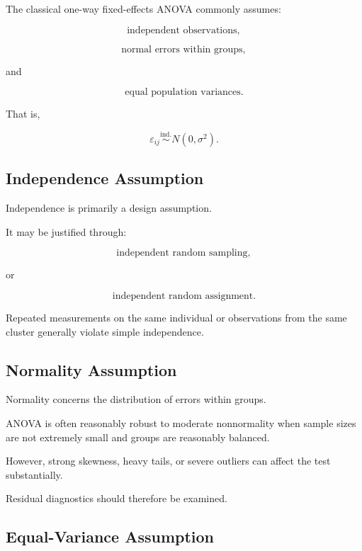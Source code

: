The classical one-way fixed-effects ANOVA commonly assumes:

\[
\boxed{
\text{independent observations},
}
\]

\[
\boxed{
\text{normal errors within groups},
}
\]

and

\[
\boxed{
\text{equal population variances}.
}
\]

That is,

\[
\boxed{
\varepsilon_{ij}
\overset{\text{ind.}}{\sim}
N(0,\sigma^2).
}
\]

\subsection{Independence Assumption}
\label{subsec:anova-independence}

Independence is primarily a design assumption.

It may be justified through:

\[
\boxed{
\text{independent random sampling},
}
\]

or

\[
\boxed{
\text{independent random assignment}.
}
\]

Repeated measurements on the same individual or observations from the
same cluster generally violate simple independence.

\subsection{Normality Assumption}
\label{subsec:anova-normality}

Normality concerns the distribution of errors within groups.

ANOVA is often reasonably robust to moderate nonnormality when sample
sizes are not extremely small and groups are reasonably balanced.

However, strong skewness, heavy tails, or severe outliers can affect the
test substantially.

Residual diagnostics should therefore be examined.

\subsection{Equal-Variance Assumption}
\label{subsec:anova-equal-variance}

